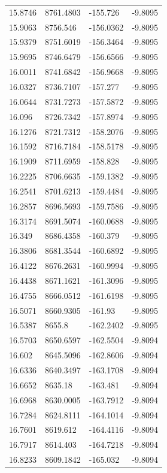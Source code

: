 \begin{table}[H]
\begin{tabular}{llll}
15.8746 & 8761.4803 & -155.726 & -9.8095 \\
15.9063 & 8756.546 & -156.0362 & -9.8095 \\
15.9379 & 8751.6019 & -156.3464 & -9.8095 \\
15.9695 & 8746.6479 & -156.6566 & -9.8095 \\
16.0011 & 8741.6842 & -156.9668 & -9.8095 \\
16.0327 & 8736.7107 & -157.277 & -9.8095 \\
16.0644 & 8731.7273 & -157.5872 & -9.8095 \\
16.096 & 8726.7342 & -157.8974 & -9.8095 \\
16.1276 & 8721.7312 & -158.2076 & -9.8095 \\
16.1592 & 8716.7184 & -158.5178 & -9.8095 \\
16.1909 & 8711.6959 & -158.828 & -9.8095 \\
16.2225 & 8706.6635 & -159.1382 & -9.8095 \\
16.2541 & 8701.6213 & -159.4484 & -9.8095 \\
16.2857 & 8696.5693 & -159.7586 & -9.8095 \\
16.3174 & 8691.5074 & -160.0688 & -9.8095 \\
16.349 & 8686.4358 & -160.379 & -9.8095 \\
16.3806 & 8681.3544 & -160.6892 & -9.8095 \\
16.4122 & 8676.2631 & -160.9994 & -9.8095 \\
16.4438 & 8671.1621 & -161.3096 & -9.8095 \\
16.4755 & 8666.0512 & -161.6198 & -9.8095 \\
16.5071 & 8660.9305 & -161.93 & -9.8095 \\
16.5387 & 8655.8 & -162.2402 & -9.8095 \\
16.5703 & 8650.6597 & -162.5504 & -9.8094 \\
16.602 & 8645.5096 & -162.8606 & -9.8094 \\
16.6336 & 8640.3497 & -163.1708 & -9.8094 \\
16.6652 & 8635.18 & -163.481 & -9.8094 \\
16.6968 & 8630.0005 & -163.7912 & -9.8094 \\
16.7284 & 8624.8111 & -164.1014 & -9.8094 \\
16.7601 & 8619.612 & -164.4116 & -9.8094 \\
16.7917 & 8614.403 & -164.7218 & -9.8094 \\
16.8233 & 8609.1842 & -165.032 & -9.8094 \\

\end{tabular}
\end{table}
